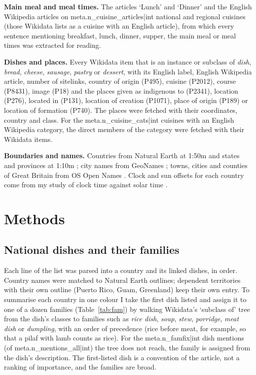 \documentclass[11pt,a4paper]{article}
\begin{document}
\textbf{Main meal and meal times.} The articles `Lunch' and `Dinner' \citep{wp_lunch,wp_dinner} and the English Wikipedia articles on {{meta.n_cuisine_articles|int}} national and regional cuisines (those Wikidata lists as a cuisine with an English article), from which every sentence mentioning breakfast, lunch, dinner, supper, the main meal or meal times was extracted for reading.

\textbf{Dishes and places.} Every Wikidata item that is an instance or subclass of \emph{dish}, \emph{bread}, \emph{cheese}, \emph{sausage}, \emph{pastry} or \emph{dessert}, with its English label, English Wikipedia article, number of sitelinks, country of origin (P495), cuisine (P2012), course (P8431), image (P18) and the places given as indigenous to (P2341), location (P276), located in (P131), location of creation (P1071), place of origin (P189) or location of formation (P740). The places were fetched with their coordinates, country and class. For the {{meta.n_cuisine_cats|int}} cuisines with an English Wikipedia category, the direct members of the category were fetched with their Wikidata items.

\textbf{Boundaries and names.} Countries from Natural Earth at 1:50m and states and provinces at 1:10m \citep{naturalearth}; city names from GeoNames \citep{geonames}; towns, cities and counties of Great Britain from OS Open Names \citep{osnames}. Clock and sun offsets for each country come from my study of clock time against solar time \citep{clockvsun}.

\section{Methods}
\subsection{National dishes and their families}
Each line of the list was parsed into a country and its linked dishes, in order. Country names were matched to Natural Earth outlines; dependent territories with their own outline (Puerto Rico, Guam, Greenland) keep their own entry. To summarise each country in one colour I take the first dish listed and assign it to one of a dozen families (Table~\ref{tab:fam}) by walking Wikidata's `subclass of' tree from the dish's classes to families such as \emph{rice dish}, \emph{soup}, \emph{stew}, \emph{porridge}, \emph{meat dish} or \emph{dumpling}, with an order of precedence (rice before meat, for example, so that a pilaf with lamb counts as rice). For the {{meta.n_famfix|int}} dish mentions (of {{meta.n_mentions_all|int}}) the tree does not reach, the family is assigned from the dish's description. The first-listed dish is a convention of the article, not a ranking of importance, and the families are broad.
\end{document}
